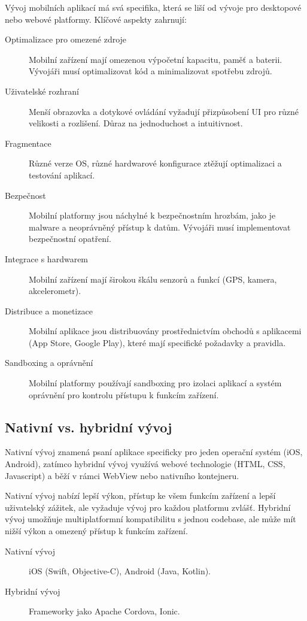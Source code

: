 Vývoj mobilních aplikací má svá specifika, která se liší od vývoje pro desktopové nebo 
webové platformy. Klíčové aspekty zahrnují:

\begin{description}
    \item[Optimalizace pro omezené zdroje] Mobilní zařízení mají omezenou výpočetní 
    kapacitu, paměť a baterii. Vývojáři musí optimalizovat kód a minimalizovat 
    spotřebu zdrojů.
    \item[Uživatelské rozhraní] Menší obrazovka a dotykové ovládání vyžadují 
    přizpůsobení UI pro různé velikosti a rozlišení. Důraz na jednoduchost a 
    intuitivnost.
    \item[Fragmentace] Různé verze OS, různé hardwarové konfigurace ztěžují 
    optimalizaci a testování aplikací.
    \item[Bezpečnost] Mobilní platformy jsou náchylné k bezpečnostním hrozbám, 
    jako je malware a neoprávněný přístup k datům. 
    Vývojáři musí implementovat bezpečnostní opatření.
    \item[Integrace s hardwarem] Mobilní zařízení mají širokou škálu senzorů a 
    funkcí (GPS, kamera, akcelerometr).
    \item[Distribuce a monetizace] Mobilní aplikace jsou distribuovány prostřednictvím 
    obchodů s aplikacemi (App Store, Google Play), které
    mají specifické požadavky a pravidla. 
    \item[Sandboxing a oprávnění] Mobilní platformy používají sandboxing pro izolaci 
    aplikací a systém oprávnění pro kontrolu přístupu k funkcím zařízení.
\end{description}

\subsection{Nativní vs. hybridní vývoj}

Nativní vývoj znamená psaní aplikace specificky pro jeden operační systém (iOS, Android), 
zatímco hybridní vývoj využívá webové technologie (HTML, CSS, Javascript) a běží v 
rámci WebView nebo nativního kontejneru.

Nativní vývoj nabízí lepší výkon, přístup ke všem funkcím zařízení a lepší uživatelský 
zážitek, ale vyžaduje vývoj pro každou platformu zvlášť. Hybridní vývoj umožňuje 
multiplatformní kompatibilitu s jednou codebase, ale může mít nižší výkon a omezený 
přístup k funkcím zařízení.

\begin{description}
    \item[Nativní vývoj] iOS (Swift, Objective-C), Android (Java, Kotlin). 
    \item[Hybridní vývoj] Frameworky jako Apache Cordova, Ionic.
\end{description}

